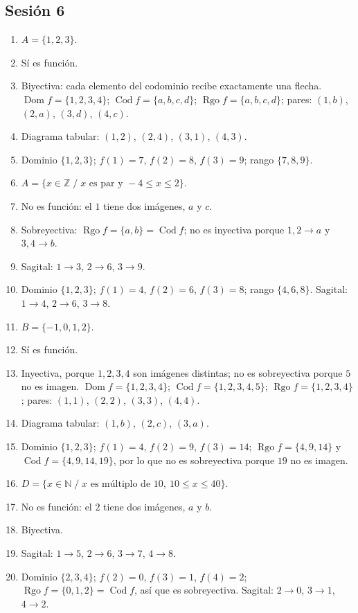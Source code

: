 \documentclass[12pt, letterpaper]{article}
\newcommand{\N}{\mathbb{N}}
\newcommand{\Z}{\mathbb{Z}}
\begin{document}
\subsection*{Sesión 6}
\begin{enumerate}[leftmargin=*, label=\textbf{\arabic*.}]
  \item $A=\{1,2,3\}$.
  \item Sí es función.
  \item Biyectiva: cada elemento del codominio recibe exactamente una flecha. $\operatorname{Dom} f=\{1,2,3,4\}$; $\operatorname{Cod} f=\{a,b,c,d\}$; $\operatorname{Rgo} f=\{a,b,c,d\}$; pares: $(1,b)$, $(2,a)$, $(3,d)$, $(4,c)$.
  \item Diagrama tabular: $(1,2)$, $(2,4)$, $(3,1)$, $(4,3)$.
  \item Dominio $\{1,2,3\}$; $f(1)=7$, $f(2)=8$, $f(3)=9$; rango $\{7,8,9\}$.
  \item $A=\{x\in\Z \;/\; x \text{ es par y } -4\le x\le 2\}$.
  \item No es función: el $1$ tiene dos imágenes, $a$ y $c$.
  \item Sobreyectiva: $\operatorname{Rgo} f=\{a,b\}=\operatorname{Cod} f$; no es inyectiva porque $1,2\to a$ y $3,4\to b$.
  \item Sagital: $1\to3$, $2\to6$, $3\to9$.
  \item Dominio $\{1,2,3\}$; $f(1)=4$, $f(2)=6$, $f(3)=8$; rango $\{4,6,8\}$. Sagital: $1\to4$, $2\to6$, $3\to8$.
  \item $B=\{-1,0,1,2\}$.
  \item Sí es función.
  \item Inyectiva, porque $1,2,3,4$ son imágenes distintas; no es sobreyectiva porque $5$ no es imagen. $\operatorname{Dom} f=\{1,2,3,4\}$; $\operatorname{Cod} f=\{1,2,3,4,5\}$; $\operatorname{Rgo} f=\{1,2,3,4\}$; pares: $(1,1)$, $(2,2)$, $(3,3)$, $(4,4)$.
  \item Diagrama tabular: $(1,b)$, $(2,c)$, $(3,a)$.
  \item Dominio $\{1,2,3\}$; $f(1)=4$, $f(2)=9$, $f(3)=14$; $\operatorname{Rgo} f=\{4,9,14\}$ y $\operatorname{Cod} f=\{4,9,14,19\}$, por lo que no es sobreyectiva porque $19$ no es imagen.
  \item $D=\{x\in\N \;/\; x \text{ es múltiplo de } 10,\ 10\le x\le 40\}$.
  \item No es función: el $2$ tiene dos imágenes, $a$ y $b$.
  \item Biyectiva.
  \item Sagital: $1\to5$, $2\to6$, $3\to7$, $4\to8$.
  \item Dominio $\{2,3,4\}$; $f(2)=0$, $f(3)=1$, $f(4)=2$; $\operatorname{Rgo} f=\{0,1,2\}=\operatorname{Cod} f$, así que es sobreyectiva. Sagital: $2\to0$, $3\to1$, $4\to2$.
\end{enumerate}
\end{document}
